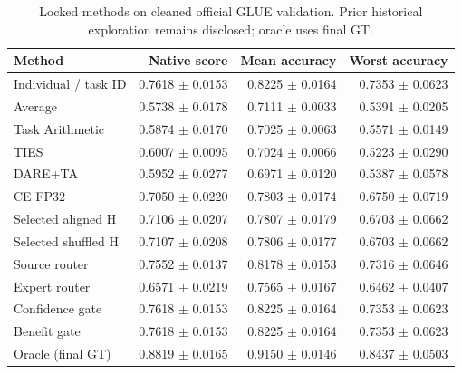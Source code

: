 \begin{table}[H]\centering\small
\caption{Locked methods on cleaned official GLUE validation. Prior historical exploration remains disclosed; oracle uses final GT.}
\begin{tabular}{lrrr}\toprule
Method & Native score & Mean accuracy & Worst accuracy\\\midrule
Individual / task ID & 0.7618 $\pm$ 0.0153 & 0.8225 $\pm$ 0.0164 & 0.7353 $\pm$ 0.0623\\
Average & 0.5738 $\pm$ 0.0178 & 0.7111 $\pm$ 0.0033 & 0.5391 $\pm$ 0.0205\\
Task Arithmetic & 0.5874 $\pm$ 0.0170 & 0.7025 $\pm$ 0.0063 & 0.5571 $\pm$ 0.0149\\
TIES & 0.6007 $\pm$ 0.0095 & 0.7024 $\pm$ 0.0066 & 0.5223 $\pm$ 0.0290\\
DARE+TA & 0.5952 $\pm$ 0.0277 & 0.6971 $\pm$ 0.0120 & 0.5387 $\pm$ 0.0578\\
CE FP32 & 0.7050 $\pm$ 0.0220 & 0.7803 $\pm$ 0.0174 & 0.6750 $\pm$ 0.0719\\
Selected aligned H & 0.7106 $\pm$ 0.0207 & 0.7807 $\pm$ 0.0179 & 0.6703 $\pm$ 0.0662\\
Selected shuffled H & 0.7107 $\pm$ 0.0208 & 0.7806 $\pm$ 0.0177 & 0.6703 $\pm$ 0.0662\\
Source router & 0.7552 $\pm$ 0.0137 & 0.8178 $\pm$ 0.0153 & 0.7316 $\pm$ 0.0646\\
Expert router & 0.6571 $\pm$ 0.0219 & 0.7565 $\pm$ 0.0167 & 0.6462 $\pm$ 0.0407\\
Confidence gate & 0.7618 $\pm$ 0.0153 & 0.8225 $\pm$ 0.0164 & 0.7353 $\pm$ 0.0623\\
Benefit gate & 0.7618 $\pm$ 0.0153 & 0.8225 $\pm$ 0.0164 & 0.7353 $\pm$ 0.0623\\
Oracle (final GT) & 0.8819 $\pm$ 0.0165 & 0.9150 $\pm$ 0.0146 & 0.8437 $\pm$ 0.0503\\
\bottomrule\end{tabular}\end{table}
